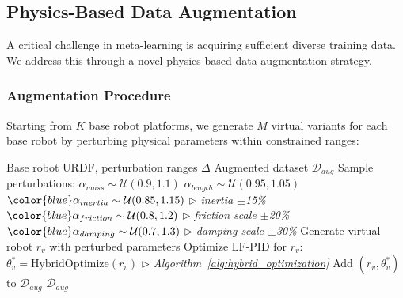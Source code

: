 \documentclass[DTMColor]{ROB-New}
\begin{document}
\subsection{Physics-Based Data Augmentation}

A critical challenge in meta-learning is acquiring sufficient diverse training data. We address this through a novel physics-based data augmentation strategy.

\subsubsection{Augmentation Procedure}

Starting from $K$ base robot platforms, we generate $M$ virtual variants for each base robot by perturbing physical parameters within constrained ranges:

\begin{algorithm}[h]
\caption{Physics-Based Data Augmentation}
\label{alg:augmentation}
\begin{algorithmic}[1]
\REQUIRE Base robot URDF, perturbation ranges $\Delta$
\ENSURE Augmented dataset $\mathcal{D}_{aug}$
        \STATE Sample perturbations: 
        \STATE \quad $\alpha_{mass} \sim \mathcal{U}(0.9, 1.1)$
        \STATE \quad $\alpha_{length} \sim \mathcal{U}(0.95, 1.05)$
        \STATE \quad ${\color{blue}\alpha_{inertia} \sim \mathcal{U}(0.85, 1.15)}$ \hfill $\triangleright$ \textit{inertia $\pm$15\%}
        \STATE \quad ${\color{blue}\alpha_{friction} \sim \mathcal{U}(0.8, 1.2)}$ \hfill $\triangleright$ \textit{friction scale $\pm$20\%}
        \STATE \quad ${\color{blue}\alpha_{damping} \sim \mathcal{U}(0.7, 1.3)}$ \hfill $\triangleright$ \textit{damping scale $\pm$30\%}
        \STATE Generate virtual robot $r_v$ with perturbed parameters
        \STATE Optimize LF-PID for $r_v$: $\theta_v^* = \text{HybridOptimize}(r_v)$ \hfill $\triangleright$ \textit{Algorithm~\ref{alg:hybrid_optimization}}
        \STATE Add $(r_v, \theta_v^*)$ to $\mathcal{D}_{aug}$
    \ENDFOR
\ENDFOR
\RETURN $\mathcal{D}_{aug}$
\end{algorithmic}
\end{algorithm}
\end{document}
